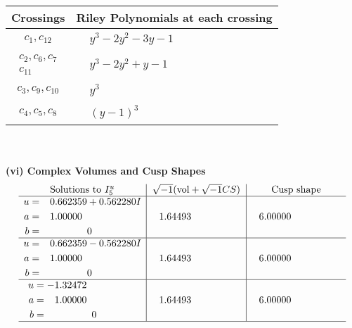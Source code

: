 \documentclass[1p]{elsarticle_modified}
\theoremstyle{definition}
\newcommand{\I}{\sqrt{-1}}
\begin{document}
\begin{tabular}{m{50pt}|m{274pt}}
Crossings & \hspace{64pt}Riley Polynomials at each crossing \\
\hline $$\begin{aligned}c_{1},c_{12}\end{aligned}$$&$\begin{aligned}
&y^3-2 y^2-3 y-1
\end{aligned}$\\
\hline $$\begin{aligned}c_{2},c_{6},c_{7}\\c_{11}\end{aligned}$$&$\begin{aligned}
&y^3-2 y^2+y-1
\end{aligned}$\\
\hline $$\begin{aligned}c_{3},c_{9},c_{10}\end{aligned}$$&$\begin{aligned}
&y^3
\end{aligned}$\\
\hline $$\begin{aligned}c_{4},c_{5},c_{8}\end{aligned}$$&$\begin{aligned}
&(y-1)^3
\end{aligned}$\\
\hline
\end{tabular}\\~\\
\newpage\flushleft \textbf{(vi) Complex Volumes and Cusp Shapes}
$$\begin{array}{c|c|c}  
\text{Solutions to }I^u_{5}& \I (\text{vol} + \sqrt{-1}CS) & \text{Cusp shape}\\
 \hline 
\begin{aligned}
u &= \phantom{-}0.662359 + 0.562280 I \\
a &= \phantom{-}1.00000\phantom{ +0.000000I} \\
b &= \phantom{-0.000000 } 0\end{aligned}
 & \phantom{-}1.64493\phantom{ +0.000000I} & \phantom{-}6.00000\phantom{ +0.000000I} \\ \hline\begin{aligned}
u &= \phantom{-}0.662359 - 0.562280 I \\
a &= \phantom{-}1.00000\phantom{ +0.000000I} \\
b &= \phantom{-0.000000 } 0\end{aligned}
 & \phantom{-}1.64493\phantom{ +0.000000I} & \phantom{-}6.00000\phantom{ +0.000000I} \\ \hline\begin{aligned}
u &= -1.32472\phantom{ +0.000000I} \\
a &= \phantom{-}1.00000\phantom{ +0.000000I} \\
b &= \phantom{-0.000000 } 0\end{aligned}
 & \phantom{-}1.64493\phantom{ +0.000000I} & \phantom{-}6.00000\phantom{ +0.000000I}\\
 \hline 
 \end{array}$$\newpage\newpage\renewcommand{\arraystretch}{1}
\end{document}
